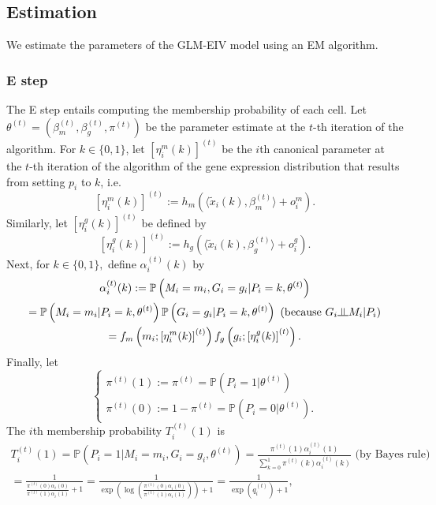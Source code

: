 \documentclass[12pt]{article}
\newcommand{\indep}{\raisebox{0.05em}{\rotatebox[origin=c]{90}{$\models$}}}
\begin{document}
\begin{appendices}
\begin{refsection}
		\subsection{Estimation}
		We estimate the parameters of the GLM-EIV model using an EM algorithm.
		\subsubsection*{E step}
		The E step entails computing the membership probability of each cell. Let $\theta^{(t)} = (\beta_m^{(t)}, \beta_g^{(t)}, \pi^{(t)})$ be the parameter estimate at the $t$-th iteration of the algorithm. For $k \in \{0,1\}$, let $[\eta^m_i(k)]^{(t)}$ be the $i$th canonical parameter at the $t$-th iteration of the algorithm of the gene expression distribution that results from setting $p_i$ to $k$, i.e.
		$$
		[\eta^m_i(k)]^{(t)} := h_m\left( \langle \tilde{x}_i(k) , \beta_m^{(t)} \rangle + o^m_i \right).
		$$ Similarly, let $\left[\eta^g_i(k)\right]^{(t)}$ be defined by
		$$\left[\eta^g_i(k)\right]^{(t)} :=  h_g\left( \langle \tilde{x}_i(k) , \beta_g^{(t)} \rangle + o^g_i \right).$$
		Next, for $k \in \{0,1\},$ define $\alpha^{(t)}_i(k)$ by
		\begin{multline*}
		\alpha^{(t)}_i(k) := \mathbb{P}\left( M_i = m_i, G_i = g_i | P_i = k, \theta^{(t)} \right) \\ = \mathbb{P}\left( M_i = m_i | P_i = k, \theta^{(t)} \right) \mathbb{P}\left(G_i = g_i | P_i = k, \theta^{(t)} \right) \textrm{ (because $G_i \indep M_i | P_i$)} \\ = f_m\left(m_i; \left[ \eta^m_i(k) \right]^{(t)}\right) f_g\left(g_i; \left[ \eta^g_i(k) \right]^{(t)} \right).
		\end{multline*}
		Finally, let 
		$$
		\begin{cases}
		\pi^{(t)}(1) := \pi^{(t)} = \mathbb{P}\left(P_i = 1 | \theta^{(t)} \right) \\
		\pi^{(t)}(0) := 1 - \pi^{(t)} = \mathbb{P}\left(P_i = 0 | \theta^{(t)} \right).
		\end{cases}
		$$
		The $i$th membership probability $T^{(t)}_i(1)$ is
		\begin{multline}\label{e_step_1}
		T^{(t)}_i(1) = \mathbb{P}(P_i = 1 | M_i = m_i, G_i = g_i, \theta^{(t)})  = \frac{\pi^{(t)}(1) \alpha^{(t)}_i(1)}{ \sum_{k=0}^1 \pi^{(t)}(k) \alpha^{(t)}_i(k)} \textrm{ (by Bayes rule)} \\ = \frac{1}{\frac{ \pi^{(t)}(0) \alpha_i(0)}{\pi^{(t)}(1) \alpha_i(1)} + 1} = \frac{1}{ \exp\left(\log\left(\frac{\pi^{(t)}(0) \alpha_i(0)}{\pi^{(t)}(1) \alpha_i(1)}\right)\right) + 1} = \frac{ 1 }{ \exp\left(q^{(t)}_i\right) + 1},

\end{multline}
\end{refsection}
\end{appendices}
\end{document}
